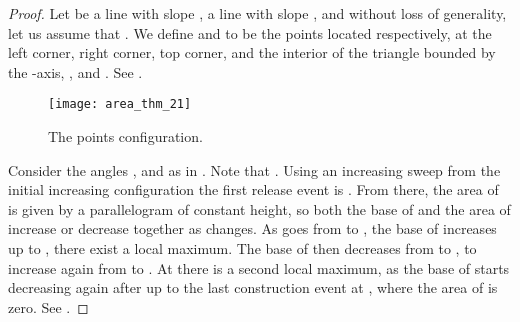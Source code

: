 \documentclass[11pt,letterpaper,english]{article}
\theoremstyle{definition}
\begin{document}
\begin{proof}
  Let  be a line with slope ,  a line
  with slope , and without loss of generality, let us
  assume that . We define  and 
  to be the points located respectively, at the left corner, right
  corner, top corner, and the interior of the triangle bounded by the
  -axis, , and . See
  .

  \begin{figure}[ht]
    \centering
    \begin{minipage}{0.9\textwidth}
      \centering
      {\texttt{[image: area\_thm\_21]}}
      \caption{The points configuration.}
      \label{apps:area:fig:bimodal_1}
    \end{minipage}
  \end{figure}

  Consider the angles , and  as in
  . Note that
  .
  Using an increasing sweep from the initial increasing configuration the
  first release event is . From there, the area of
   is given by a parallelogram  of
  constant height, so both the base of  and the
  area of  increase or decrease together as 
  changes. As  goes from  to , the base
  of  increases up to , there
  exist a local maximum. The base of  then
  decreases from  to , to increase again from
   to . At  there is a second local
  maximum, as the base of  starts decreasing
  again after  up to the last construction event at
  , where the area of  is zero. See
  .
\end{proof}
\end{document}
